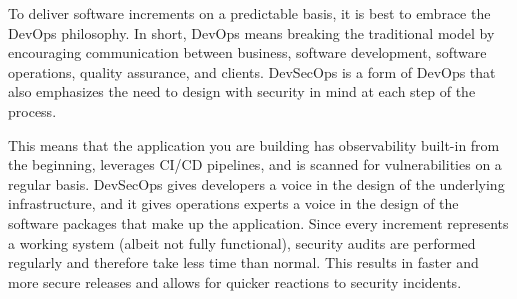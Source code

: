 
To deliver software increments on a predictable basis, it is best to embrace the DevOps philosophy. In short, DevOps means breaking the traditional model by encouraging communication between business, software development, software operations, quality assurance, and clients. DevSecOps is a form of DevOps that also emphasizes the need to design with security in mind at each step of the process.

This means that the application you are building has observability built-in from the beginning, leverages CI/CD pipelines, and is scanned for vulnerabilities on a regular basis. DevSecOps gives developers a voice in the design of the underlying infrastructure, and it gives operations experts a voice in the design of the software packages that make up the application. Since every increment represents a working system (albeit not fully functional), security audits are performed regularly and therefore take less time than normal. This results in faster and more secure releases and allows for quicker reactions to security incidents.









